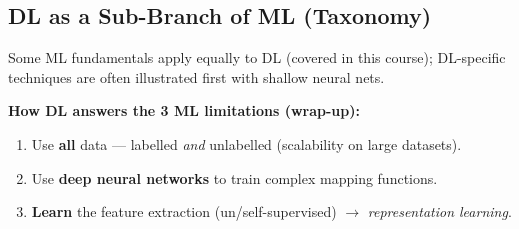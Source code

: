 \documentclass[10pt,a4paper]{article}
\begin{document}
	\subsection{DL as a Sub-Branch of ML (Taxonomy)}

	\begin{center}
	\end{center}
	\noindent\footnotesize Some ML fundamentals apply equally to DL (covered in this course); DL-specific techniques are often illustrated first with shallow neural nets.\normalsize

	\begin{importantbox}
		\textbf{How DL answers the 3 ML limitations (wrap-up):}
		\begin{enumerate}[leftmargin=*]
			\item Use \textbf{all} data --- labelled \emph{and} unlabelled (scalability on large datasets).
			\item Use \textbf{deep neural networks} to train complex mapping functions.
			\item \textbf{Learn} the feature extraction (un/self-supervised) $\rightarrow$ \emph{representation learning}.
		\end{enumerate}
	\end{importantbox}
\end{document}
